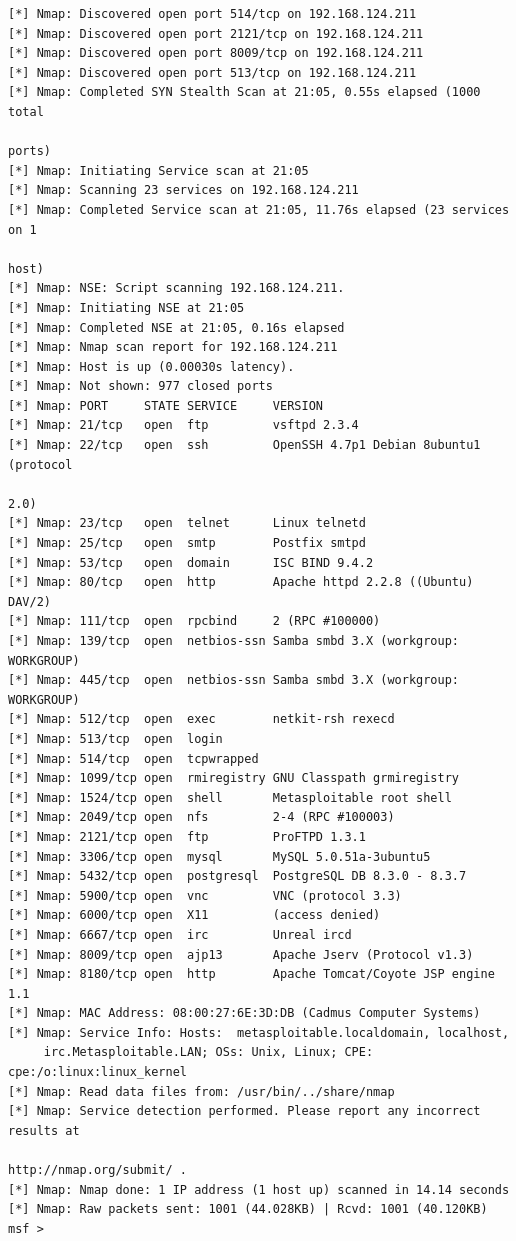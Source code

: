 \documentclass[a4paper, 12pt]{article}		%
\begin{document}
\begin{Verbatim}[frame=single]
[*] Nmap: Discovered open port 514/tcp on 192.168.124.211
[*] Nmap: Discovered open port 2121/tcp on 192.168.124.211
[*] Nmap: Discovered open port 8009/tcp on 192.168.124.211
[*] Nmap: Discovered open port 513/tcp on 192.168.124.211
[*] Nmap: Completed SYN Stealth Scan at 21:05, 0.55s elapsed (1000 total
                                                                       ports)
[*] Nmap: Initiating Service scan at 21:05
[*] Nmap: Scanning 23 services on 192.168.124.211
[*] Nmap: Completed Service scan at 21:05, 11.76s elapsed (23 services on 1
                                                                        host)
[*] Nmap: NSE: Script scanning 192.168.124.211.
[*] Nmap: Initiating NSE at 21:05
[*] Nmap: Completed NSE at 21:05, 0.16s elapsed
[*] Nmap: Nmap scan report for 192.168.124.211
[*] Nmap: Host is up (0.00030s latency).
[*] Nmap: Not shown: 977 closed ports
[*] Nmap: PORT     STATE SERVICE     VERSION
[*] Nmap: 21/tcp   open  ftp         vsftpd 2.3.4
[*] Nmap: 22/tcp   open  ssh         OpenSSH 4.7p1 Debian 8ubuntu1 (protocol
                                                                         2.0)
[*] Nmap: 23/tcp   open  telnet      Linux telnetd
[*] Nmap: 25/tcp   open  smtp        Postfix smtpd
[*] Nmap: 53/tcp   open  domain      ISC BIND 9.4.2
[*] Nmap: 80/tcp   open  http        Apache httpd 2.2.8 ((Ubuntu) DAV/2)
[*] Nmap: 111/tcp  open  rpcbind     2 (RPC #100000)
[*] Nmap: 139/tcp  open  netbios-ssn Samba smbd 3.X (workgroup: WORKGROUP)
[*] Nmap: 445/tcp  open  netbios-ssn Samba smbd 3.X (workgroup: WORKGROUP)
[*] Nmap: 512/tcp  open  exec        netkit-rsh rexecd
[*] Nmap: 513/tcp  open  login
[*] Nmap: 514/tcp  open  tcpwrapped
[*] Nmap: 1099/tcp open  rmiregistry GNU Classpath grmiregistry
[*] Nmap: 1524/tcp open  shell       Metasploitable root shell
[*] Nmap: 2049/tcp open  nfs         2-4 (RPC #100003)
[*] Nmap: 2121/tcp open  ftp         ProFTPD 1.3.1
[*] Nmap: 3306/tcp open  mysql       MySQL 5.0.51a-3ubuntu5
[*] Nmap: 5432/tcp open  postgresql  PostgreSQL DB 8.3.0 - 8.3.7
[*] Nmap: 5900/tcp open  vnc         VNC (protocol 3.3)
[*] Nmap: 6000/tcp open  X11         (access denied)
[*] Nmap: 6667/tcp open  irc         Unreal ircd
[*] Nmap: 8009/tcp open  ajp13       Apache Jserv (Protocol v1.3)
[*] Nmap: 8180/tcp open  http        Apache Tomcat/Coyote JSP engine 1.1
[*] Nmap: MAC Address: 08:00:27:6E:3D:DB (Cadmus Computer Systems)
[*] Nmap: Service Info: Hosts:  metasploitable.localdomain, localhost, 
     irc.Metasploitable.LAN; OSs: Unix, Linux; CPE: cpe:/o:linux:linux_kernel
[*] Nmap: Read data files from: /usr/bin/../share/nmap
[*] Nmap: Service detection performed. Please report any incorrect results at
                                                    http://nmap.org/submit/ .
[*] Nmap: Nmap done: 1 IP address (1 host up) scanned in 14.14 seconds
[*] Nmap: Raw packets sent: 1001 (44.028KB) | Rcvd: 1001 (40.120KB)
msf > 
\end{Verbatim}
\end{document}
